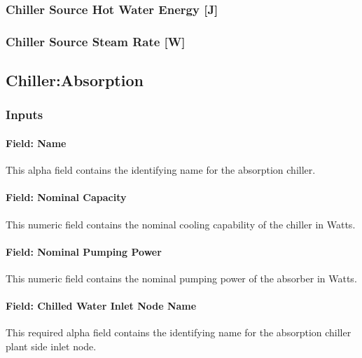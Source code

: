 \subsubsection{Chiller Source Hot Water Energy {[}J{]}}\label{chiller-source-hot-water-energy-j}

\subsubsection{Chiller Source Steam Rate {[}W{]}}\label{chiller-source-steam-rate-w}

\subsection{Chiller:Absorption}\label{chillerabsorption}

\subsubsection{Inputs}\label{inputs-036}

\paragraph{Field: Name}\label{field-name-035}

This alpha field contains the identifying name for the absorption chiller.

\paragraph{Field: Nominal Capacity}\label{field-nominal-capacity-001}

This numeric field contains the nominal cooling capability of the chiller in Watts.

\paragraph{Field: Nominal Pumping Power}\label{field-nominal-pumping-power}

This numeric field contains the nominal pumping power of the absorber in Watts.

\paragraph{Field: Chilled Water Inlet Node Name}\label{field-chilled-water-inlet-node-name-000}

This required alpha field contains the identifying name for the absorption chiller plant side inlet node.

